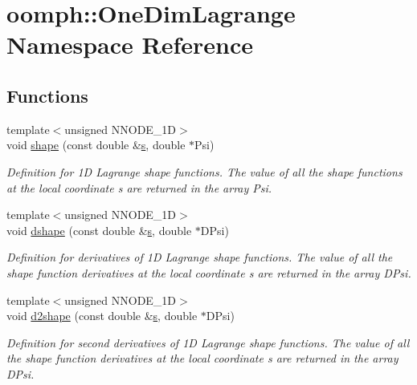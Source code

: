 \hypertarget{namespaceoomph_1_1OneDimLagrange}{}\section{oomph\+:\+:One\+Dim\+Lagrange Namespace Reference}
\label{namespaceoomph_1_1OneDimLagrange}
\subsection*{Functions}
\begin{DoxyCompactItemize}
\item 
{\footnotesize template$<$unsigned N\+N\+O\+D\+E\+\_\+1D$>$ }\\void \hyperlink{namespaceoomph_1_1OneDimLagrange_a117f8b892dc89989ecdad99ff261e120}{shape} (const double \&\hyperlink{cfortran_8h_ab7123126e4885ef647dd9c6e3807a21c}{s}, double $\ast$Psi)
\begin{DoxyCompactList}\small\item\em Definition for 1D Lagrange shape functions. The value of all the shape functions at the local coordinate s are returned in the array Psi. \end{DoxyCompactList}\item 
{\footnotesize template$<$unsigned N\+N\+O\+D\+E\+\_\+1D$>$ }\\void \hyperlink{namespaceoomph_1_1OneDimLagrange_af66e48b956c460371ac77032c1efcd72}{dshape} (const double \&\hyperlink{cfortran_8h_ab7123126e4885ef647dd9c6e3807a21c}{s}, double $\ast$D\+Psi)
\begin{DoxyCompactList}\small\item\em Definition for derivatives of 1D Lagrange shape functions. The value of all the shape function derivatives at the local coordinate s are returned in the array D\+Psi. \end{DoxyCompactList}\item 
{\footnotesize template$<$unsigned N\+N\+O\+D\+E\+\_\+1D$>$ }\\void \hyperlink{namespaceoomph_1_1OneDimLagrange_a9515ce1aa8ef987244c379655c41fa01}{d2shape} (const double \&\hyperlink{cfortran_8h_ab7123126e4885ef647dd9c6e3807a21c}{s}, double $\ast$D\+Psi)
\begin{DoxyCompactList}\small\item\em Definition for second derivatives of 1D Lagrange shape functions. The value of all the shape function derivatives at the local coordinate s are returned in the array D\+Psi. \end{DoxyCompactList}\item 

\end{DoxyCompactItemize}
